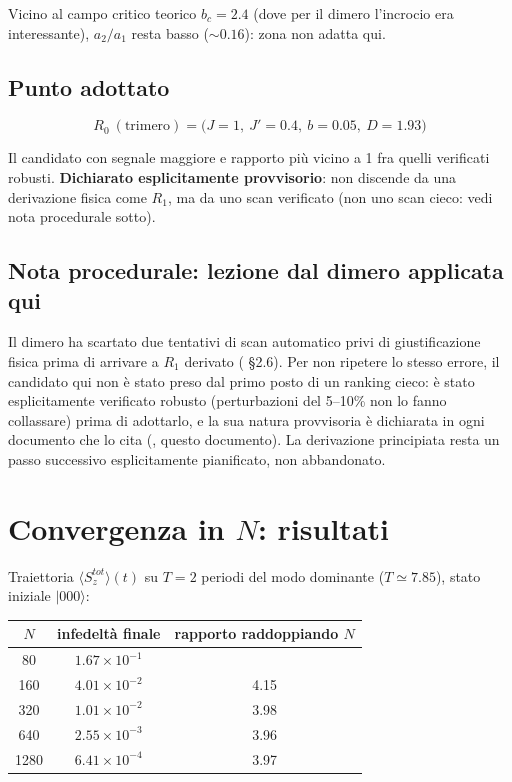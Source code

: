 \documentclass[11pt,a4paper]{article}
\newcommand{\ket}[1]{\lvert #1 \rangle}
\begin{document}
Vicino al campo critico teorico $b_c=2.4$ (dove per il dimero l'incrocio
era interessante), $a_2/a_1$ resta basso ($\sim0.16$): zona non adatta
qui.

\subsection{Punto adottato}

\begin{equation*}
\boxed{R_0\ (\text{trimero}) = \big(J{=}1,\ J'{=}0.4,\ b{=}0.05,\ D{=}1.93\big)}
\end{equation*}

Il candidato con segnale maggiore e rapporto più vicino a 1 fra quelli
verificati robusti. \textbf{Dichiarato esplicitamente provvisorio}: non
discende da una derivazione fisica come $R_1$, ma da uno scan verificato
(non uno scan cieco: vedi nota procedurale sotto).

\subsection{Nota procedurale: lezione dal dimero applicata qui}

Il dimero ha scartato due tentativi di scan automatico privi di
giustificazione fisica prima di arrivare a $R_1$ derivato
(\texttt{} \S2.6). Per non
ripetere lo stesso errore, il candidato qui non è stato preso dal primo
posto di un ranking cieco: è stato esplicitamente verificato robusto
(perturbazioni del 5--10\% non lo fanno collassare) prima di adottarlo, e
la sua natura provvisoria è dichiarata in ogni documento che lo cita
(\texttt{}, questo documento). La derivazione principiata
resta un passo successivo esplicitamente pianificato, non abbandonato.

\section{Convergenza in $N$: risultati}

Traiettoria $\langle S_z^{tot}\rangle(t)$ su $T=2$ periodi del modo
dominante ($T\simeq7.85$), stato iniziale $\ket{000}$:

\begin{center}
\begin{tabular}{@{}ccc@{}}
\toprule
$N$ & infedeltà finale & rapporto raddoppiando $N$ \\
\midrule
80 & $1.67\times10^{-1}$ & \\
160 & $4.01\times10^{-2}$ & 4.15 \\
320 & $1.01\times10^{-2}$ & 3.98 \\
640 & $2.55\times10^{-3}$ & 3.96 \\
1280 & $6.41\times10^{-4}$ & 3.97 \\
\bottomrule
\end{tabular}
\end{center}
\end{document}

